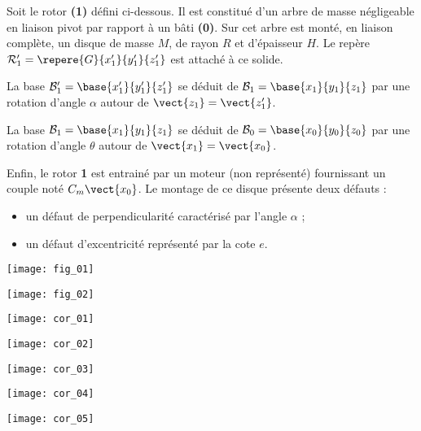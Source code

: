 \ifprof
\else
\begin{multicols}{2}
\fi


Soit le rotor \textbf{(1)} défini ci-dessous. Il est constitué d'un arbre de masse négligeable en liaison pivot par rapport à un bâti \textbf{(0)}. Sur cet arbre est monté, en liaison complète, un disque de masse $M$, de rayon $R$ et d'épaisseur $H$. 
Le repère $\mathcal{R}'_1=\repere{G}{x_1'}{y_1'}{z_1'}$ est attaché à ce solide.

La base $\mathcal{B}'_1=\base{x_1'}{y_1'}{z_1'}$ se déduit de $\mathcal{B}_1=\base{x_1}{y_1}{z_1}$  par une rotation d'angle $\alpha$ autour de $\vect{z_1}= \vect{z_1'}$. 

La base $\mathcal{B}_1=\base{x_1}{y_1}{z_1}$ se déduit de $\mathcal{B}_0=\base{x_0}{y_0}{z_0}$  par une rotation d'angle $\theta$ autour de $\vect{x_1}= \vect{x_0}$. 

Enfin, le rotor \textbf{1} est entrainé par un moteur (non représenté) fournissant un couple noté $C_m\vect{x_0}$. 
Le montage de ce disque présente deux défauts :
\begin{itemize}
\item un défaut de perpendicularité caractérisé par l'angle $\alpha$ ;
\item un défaut d'excentricité représenté par la cote $e$.
\end{itemize}


\begin{center}
\texttt{[image: fig\_01]}
\end{center}
\begin{center}
\texttt{[image: fig\_02]}
\end{center}




\ifprof
\else
\end{multicols}
\fi



\ifprof
\begin{center}
\texttt{[image: cor\_01]}
\end{center}
\begin{center}
\texttt{[image: cor\_02]}
\end{center}
\begin{center}
\texttt{[image: cor\_03]}
\end{center}
\begin{center}
\texttt{[image: cor\_04]}
\end{center}
\begin{center}
\texttt{[image: cor\_05]}
\end{center}

\else
\fi

